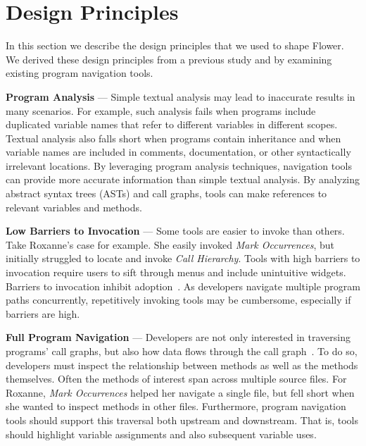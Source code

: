 \documentclass[conference]{IEEEtran}
\begin{document}
\section{Design Principles}
\label{DesignPrinciples}
In this section we describe the design principles that we used to shape Flower. We derived these design principles from a previous study \cite{Smith2015} and by examining existing program navigation tools.
 
\vspace{1em} 
\noindent\textbf{Program Analysis} ---
Simple textual analysis may lead to inaccurate results in many scenarios. For example, such analysis fails when programs include duplicated variable names that refer to different variables in different scopes. Textual analysis also falls short when programs contain inheritance and when variable names are included in comments, documentation, or other syntactically irrelevant locations.
By leveraging program analysis techniques, navigation tools can provide more accurate information than simple textual analysis.
By analyzing abstract syntax trees (ASTs) and call graphs, tools can make references to relevant variables and methods. 

\vspace{1em} 
\noindent\textbf{Low Barriers to Invocation} ---
Some tools are easier to invoke than others. 
Take Roxanne's case for example.
She easily invoked \emph{Mark Occurrences}, but initially struggled to locate and invoke \emph{Call Hierarchy}.
Tools with high barriers to invocation require users to sift through menus and include unintuitive widgets. 
Barriers to invocation inhibit adoption~\cite{johnson2013don}.
As developers navigate multiple program paths concurrently, repetitively invoking tools may be cumbersome, especially if barriers are high. 


\vspace{1em} 
\noindent\textbf{Full Program Navigation}  ---
Developers are not only interested in traversing programs' call graphs, but also how data flows through the call graph~\cite{Smith2015}.
To do so, developers must inspect the relationship between methods as well as the methods themselves.
Often the methods of interest span across multiple source files.
For Roxanne, \emph{Mark Occurrences} helped her navigate a single file, but fell short when she wanted to inspect methods in other files.
Furthermore, program navigation tools should support this traversal both upstream and downstream. 
That is, tools should highlight variable assignments and also subsequent variable uses. 
\end{document}
